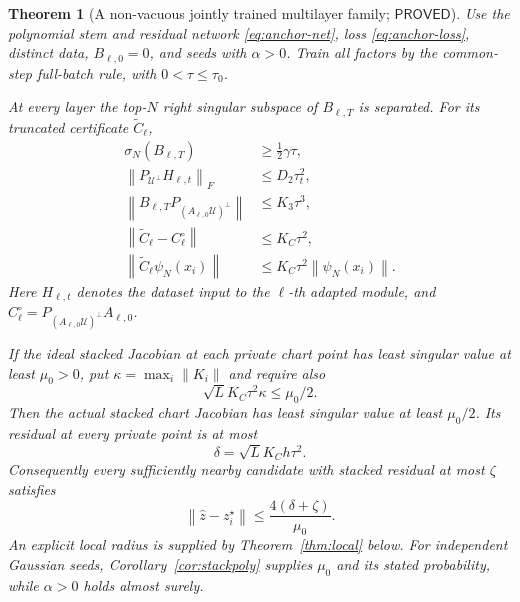 \documentclass[12pt,a4paper]{article}
\theoremstyle{readable}
\newtheorem{theorem}{Theorem}[section]
\theoremstyle{definition}\newtheorem{example}[theorem]{Example}
\newcommand{\norm}[1]{\left\|#1\right\|}
\newcommand{\PP}{\mathsf{PROVED}}\newcommand{\FF}{\mathsf{FALSE}}
\begin{document}
\begin{theorem}[A non-vacuous jointly trained multilayer family; \(\PP\)]\label{thm:anchor}
Use the polynomial stem and residual network \eqref{eq:anchor-net}, loss \eqref{eq:anchor-loss}, distinct data, \(B_{\ell,0}=0\), and seeds with \(\alpha>0\). Train all factors by the common-step full-batch rule, with \(0<\tau\le\tau_0\).

At every layer the top-\(N\) right singular subspace of \(B_{\ell,T}\) is separated. For its truncated certificate \(\widetilde C_\ell\),
\begin{align}
\sigma_N(B_{\ell,T})&\ge\tfrac12\gamma\tau,\label{eq:anchor-gap}\\
\norm{P_{\mathcal U^\perp}H_{\ell,t}}_F&\le D_2\tau_t^2,\label{eq:anchor-drift}\\
\norm{B_{\ell,T}P_{(A_{\ell,0}\mathcal U)^\perp}}&\le K_3\tau^3,\label{eq:anchor-leak}\\
\norm{\widetilde C_\ell-C_\ell^\circ}&\le K_C\tau^2,\label{eq:anchor-error}\\
\norm{\widetilde C_\ell\psi_N(x_i)}&\le K_C\tau^2\norm{\psi_N(x_i)}.
\end{align}
Here \(H_{\ell,t}\) denotes the dataset input to the \(\ell\)-th adapted module, and \(C_\ell^\circ=P_{(A_{\ell,0}\mathcal U)^\perp}A_{\ell,0}\).

If the ideal stacked Jacobian at each private chart point has least singular value at least \(\mu_0>0\), put \(\kappa=\max_i\norm{K_i}\) and require also
\begin{equation}\label{eq:anchor-window}
\sqrt L K_C\tau^2\kappa\le\mu_0/2.
\end{equation}
Then the actual stacked chart Jacobian has least singular value at least \(\mu_0/2\). Its residual at every private point is at most
\[
\delta=\sqrt L K_C h\tau^2.
\]
Consequently every sufficiently nearby candidate with stacked residual at most \(\zeta\) satisfies
\begin{equation}\label{eq:anchor-recon}
\norm{\widehat z-z_i^\star}\le\frac{4(\delta+\zeta)}{\mu_0}.
\end{equation}
An explicit local radius is supplied by Theorem~\ref{thm:local} below. For independent Gaussian seeds, Corollary~\ref{cor:stackpoly} supplies \(\mu_0\) and its stated probability, while \(\alpha>0\) holds almost surely.
\end{theorem}
\end{document}
